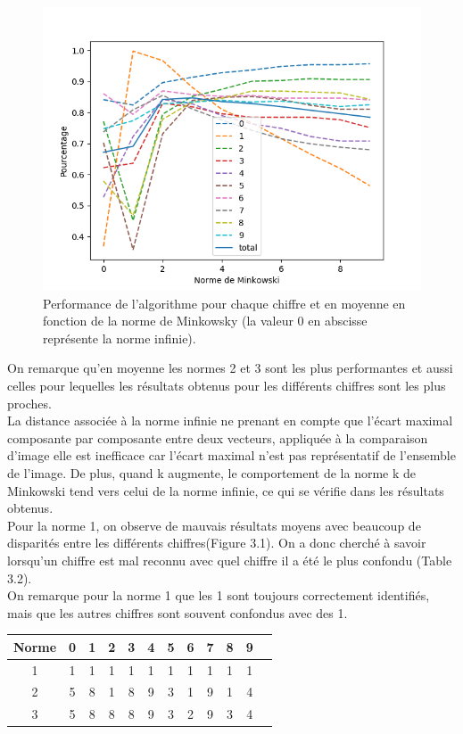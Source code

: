 \documentclass[a4paper,11pt,twoside]{report}
\begin{document}
\begin{figure}[H]
  	\includegraphics[width=\linewidth]{Graphs/normsminky.png}
  	\caption{Performance de l'algorithme pour chaque chiffre et en moyenne en fonction de la norme de Minkowsky (la valeur 0 en abscisse représente la norme infinie).}
\end{figure}

On remarque qu'en moyenne les normes 2 et 3 sont les plus performantes et aussi celles pour lequelles les résultats obtenus pour les différents chiffres sont les plus proches. \\
La distance associée à la norme infinie ne prenant en compte que l'écart maximal composante par composante entre deux vecteurs, appliquée à la comparaison d'image elle est inefficace car l'écart maximal n'est pas représentatif de l'ensemble de l'image. De plus, quand k augmente, le comportement de la norme k de Minkowski tend vers celui de la norme infinie, ce qui se vérifie dans les résultats obtenus.\\ 
Pour la norme 1, on observe de mauvais résultats moyens avec beaucoup de disparités entre les différents chiffres(Figure 3.1). On a donc cherché à savoir lorsqu'un chiffre est mal reconnu avec quel chiffre il a été le plus confondu (Table 3.2).\\
On remarque pour la norme 1 que les 1 sont toujours correctement identifiés, mais que les autres chiffres sont souvent confondus avec des 1.

\begin{center}
\begin{tabular}{ |c||c|c|c|c|c|c|c|c|c|c|c| } 
\hline
 Norme & 0 & 1 & 2 & 3 & 4 & 5 & 6 & 7 & 8 & 9 \\ 
  \hline
  \hline
  1 & 1 & 1 & 1 & 1 & 1 & 1 & 1 & 1 & 1 & 1 \\
 \hline
  2 & 5 & 8 & 1 & 8 & 9 & 3 & 1 & 9 & 1 & 4 \\
 \hline
  3 & 5 & 8 & 8 & 8 & 9 & 3 & 2 & 9 & 3 & 4 \\
 \hline
\end{tabular}
\end{center}
\end{document}
